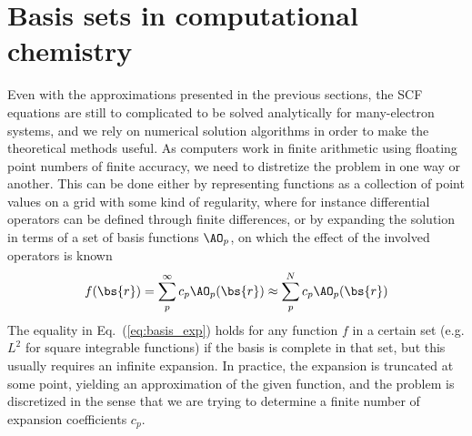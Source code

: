 \pagebreak

\section{Basis sets in computational chemistry}
Even with the approximations presented in the previous sections, the SCF equations are still
to complicated to be solved analytically for many-electron systems, and we rely on numerical
solution algorithms in order to make the theoretical methods useful. As computers work in finite
arithmetic using floating point numbers of finite accuracy, we need to distretize the problem 
in one way or another. This can be done either by representing functions as a collection of
point values on a grid with some kind of regularity, where for instance differential operators
can be defined through finite differences, or by expanding the solution in terms of a set of 
basis functions $\AO_p$, on which the effect of the involved operators is known
\begin{equation}
    \label{eq:basis_exp}
    f(\bs{r}) = \sum_p^\infty c_p \AO_p(\bs{r}) \approx \sum_p^N c_p \AO_p(\bs{r})
\end{equation}
The equality in Eq.~(\ref{eq:basis_exp}) holds for any function $f$ in a certain set (e.g. $L^2$ 
for square integrable functions) if the basis is complete in that set, but this usually requires 
an infinite expansion. In practice, the expansion is truncated at some point, yielding an 
approximation of the given function, and the problem is discretized in the sense that we are 
trying to determine a finite number of expansion coefficients $c_p$. 

